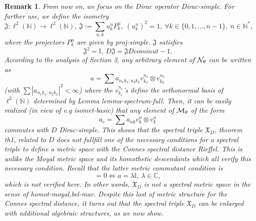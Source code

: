 \documentclass[10pt]{book}
\theoremstyle{break}
\newtheorem{remark}{Remark}
\begin{document}
\begin{remark}
From now on, we focus on the Dirac operator {Dirac-simple}. For further use, we define the isometry
\begin{equation*}
\mathfrak{J}:\ell^2(\mathbb{N})\to\ell^2(\mathbb{N}),\ \mathfrak{J}:=\sum_{n,k}u^n_kP^n_k,\ (u^n_k)^2=1,\ \forall k\in\{0,1,...,n-1\},\ n\in\mathbb{N}^*,
\end{equation*}
where the projectors $P^n_k$ are given by {proj-simple}. $\mathfrak{J}$ satisfies
\begin{equation*}
\mathfrak{J}^2=\mathbb{I},\ D\mathfrak{J}=\mathfrak{J}D{commut-1}. 
\end{equation*}
According to the analysis of Section 3, any arbitrary element of ${\cal{N}}_\theta$ can be written as 
\begin{equation*}
a=\sum a_{n_1k_1;n_2k_2}v^{n_1}_{k_1}\otimes v^{n_2}_{k_2}
\end{equation*}
(with $\sum |a_{n_1k_1;n_2k_2} |^2<\infty$) where the $v^{n_i}_{k_i}$'s define the orthonormal basis of $\ell^2(\mathbb{N})$ determined by Lemma {lemma-spectrum-full}. Then, it can be easily realized (in view of e.g {isomet-basic}) that any element of ${\cal{M}}_\theta$ of the form 
\begin{equation*}
a_c=\sum a_{nk}v^n_k\otimes v^n_k 
\end{equation*}
commutes with $D$ {Dirac-simple}. This shows that the spectral triple $\mathfrak{X}_D$, theorem {th1}, related to $D$ does not fullfill one of the necessary conditions for a spectral triple to define a metric space with the Connes spectral distance {Rieffel}. This is unlike the Moyal metric space and its homothetic descendants which all verify this necessary condition. Recall that the latter metric commutant condition is 
\begin{equation*}
[D,\eta(a)]=0\iff a=\lambda\mathbb{I},\ \lambda\in\mathbb{C},
\end{equation*}
which is not verified here. In other words, $\mathfrak{X}_D$ is not a spectral metric space in the sense of {homot-moyal,bel-mar}. Despite this lost of metric structure for the Connes spectral distance, it turns out that the spectral triple $\mathfrak{X}_D$ can be enlarged with additional algebraic structures, as we now show.
\end{remark}
\end{document}
